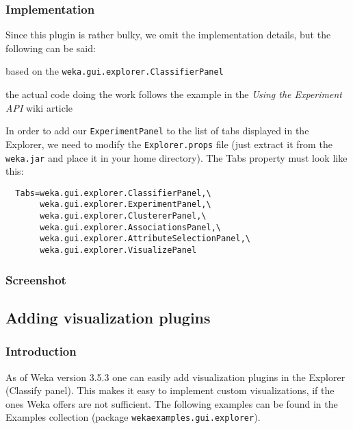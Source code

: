 \subsubsection*{Implementation}
\begin{tight_itemize}
  \item Since this plugin is rather bulky, we omit the implementation details,
but the following can be said:
  \begin{tight_itemize}
	\item based on the \texttt{weka.gui.explorer.ClassifierPanel}
	\item the actual code doing the work follows the example in the
\textit{Using the Experiment API} wiki article \cite{wekawiki}
  \end{tight_itemize}
  \item In order to add our \texttt{ExperimentPanel} to the list of tabs
displayed in the Explorer, we need to modify the \texttt{Explorer.props} file
(just extract it from the \texttt{weka.jar} and place it in your home
directory). The Tabs property must look like this:
  \begin{verbatim}
  Tabs=weka.gui.explorer.ClassifierPanel,\
       weka.gui.explorer.ExperimentPanel,\
       weka.gui.explorer.ClustererPanel,\
       weka.gui.explorer.AssociationsPanel,\
       weka.gui.explorer.AttributeSelectionPanel,\
       weka.gui.explorer.VisualizePanel
  \end{verbatim}
\end{tight_itemize}

\subsubsection*{Screenshot}
\begin{center}
\end{center}

\newpage
\subsection{Adding visualization plugins}
\subsubsection*{Introduction}
As of Weka version 3.5.3 one can easily add visualization plugins in the
Explorer (Classify panel). This makes it easy to implement custom
visualizations, if the ones Weka offers are not sufficient. The following
examples can be found in the Examples collection \cite{wekaexamples} (package
\texttt{wekaexamples.gui.explorer}).

